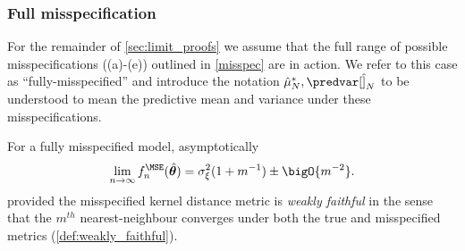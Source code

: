 \subsubsection{Full misspecification}
For the remainder of \ref{sec:limit_proofs} we assume that the full range of possible misspecifications ((a)-(e)) outlined in \autoref{misspec} are in action. We refer to this case as ``fully-misspecified'' and introduce the notation \(\hat{\mu}_N^*,\predvar[\hat]_N\) to be understood to mean the predictive mean and variance under these misspecifications.
\begin{lemma}
    \label{lem:mismatched_mse_limit}
    For a fully misspecified model, asymptotically
    \[\lim_{n\rightarrow\infty}f_n^{\MSE}(\hat{\bm{\theta}}) = \sigma_\xi^2(1+m^{-1}) \pm \bigO{m^{-2}}.\]
    provided the misspecified kernel distance metric is \emph{weakly faithful} in the sense that the \(m^{th}\) nearest-neighbour converges under both the true and misspecified metrics (\autoref{def:weakly_faithful}).
\end{lemma}
